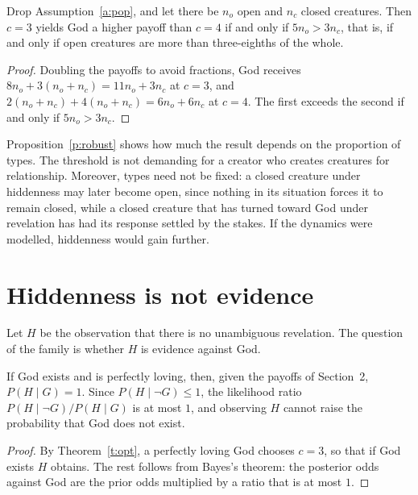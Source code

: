 \documentclass{situationist-preprint}
\begin{document}
\begin{proposition}[Robustness]\label{p:robust}
Drop Assumption~\ref{a:pop}, and let there be $n_o$ open and $n_c$ closed creatures. Then $c = 3$ yields God a higher payoff than $c = 4$ if and only if $5 n_o > 3 n_c$, that is, if and only if open creatures are more than three-eighths of the whole.
\end{proposition}

\begin{proof}
Doubling the payoffs to avoid fractions, God receives $8 n_o + 3(n_o + n_c) = 11 n_o + 3 n_c$ at $c = 3$, and $2(n_o + n_c) + 4(n_o + n_c) = 6 n_o + 6 n_c$ at $c = 4$. The first exceeds the second if and only if $5 n_o > 3 n_c$.
\end{proof}

Proposition~\ref{p:robust} shows how much the result depends on the proportion of types. The threshold is not demanding for a creator who creates creatures for relationship. Moreover, types need not be fixed: a closed creature under hiddenness may later become open, since nothing in its situation forces it to remain closed, while a closed creature that has turned toward God under revelation has had its response settled by the stakes. If the dynamics were modelled, hiddenness would gain further.

\section{Hiddenness is not evidence}\label{s:evidence}

Let $H$ be the observation that there is no unambiguous revelation. The question of the family is whether $H$ is evidence against God.

\begin{theorem}\label{t:noevidence}
If God exists and is perfectly loving, then, given the payoffs of Section~2, $P(H \mid G) = 1$. Since $P(H \mid \neg G) \leq 1$, the likelihood ratio $P(H \mid \neg G) / P(H \mid G)$ is at most $1$, and observing $H$ cannot raise the probability that God does not exist.
\end{theorem}

\begin{proof}
By Theorem~\ref{t:opt}, a perfectly loving God chooses $c = 3$, so that if God exists $H$ obtains. The rest follows from Bayes's theorem: the posterior odds against God are the prior odds multiplied by a ratio that is at most $1$.
\end{proof}
\end{document}
